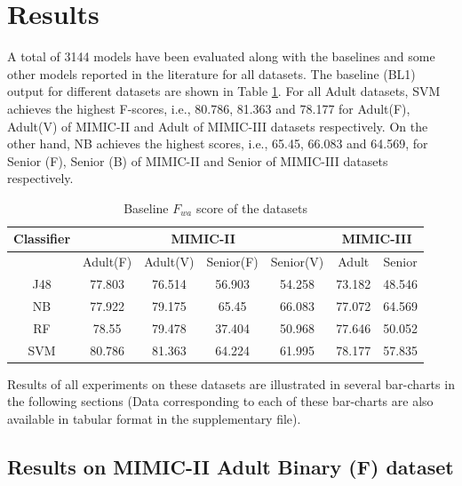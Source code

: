 \section{Results}\label{s:results}
A total of 3144 models have been evaluated along with the baselines and some other models reported in the literature for all datasets. The baseline (BL1) output for different datasets are shown in Table \ref{t:baselineoutput}. For all Adult datasets, SVM achieves the highest F-scores, i.e., 80.786, 81.363 and 78.177 for Adult(F), Adult(V) of MIMIC-II and Adult of MIMIC-III datasets respectively. On the other hand, NB achieves the highest scores, i.e., 65.45, 66.083 and 64.569, for Senior (F), Senior (B) of MIMIC-II and Senior of MIMIC-III datasets respectively.  

\begin{table}[h] 
	\centering \caption{Baseline $F_{wa}$ score of the datasets} 
	\begin{tabular}{|c|c|c|c|c|c|c|}\hline	
	Classifier & \multicolumn{4}{|c|}{MIMIC-II} & \multicolumn{2}{|c|}{MIMIC-III} \\\hline
	& Adult(F) & Adult(V) & Senior(F) & Senior(V) & Adult & Senior \\\hline
	J48 & 77.803 & 76.514 & 56.903 & 54.258 & 73.182 & 48.546 \\\hline
	NB & 77.922 & 79.175 & 65.45 & 66.083 & 77.072 & 64.569 \\\hline
	RF & 78.55 & 79.478 & 37.404 & 50.968 & 77.646 & 50.052 \\\hline
	SVM & 80.786 & 81.363 & 64.224 & 61.995 & 78.177 & 57.835 \\\hline
\end{tabular}
\label{t:baselineoutput}
\end{table}

Results of all experiments on these datasets are illustrated in several bar-charts in the following sections (Data corresponding to each of these bar-charts are also available in tabular format in the supplementary file).

\subsection{Results on MIMIC-II Adult Binary (F) dataset}

